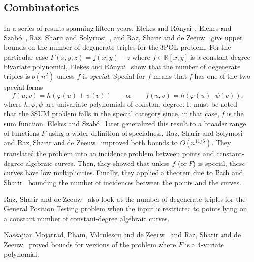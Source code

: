 \subsection{Combinatorics}%
\label{sec:problem:pol:combinatorics}

In a series of results spanning fifteen years,
Elekes and Rónyai~\cite{ER00},
Elekes and Szabó~\cite{ES12},
Raz, Sharir and Solymosi~\cite{RSS14}, and
Raz, Sharir and de Zeeuw~\cite{RSZ15}
give upper bounds on the number of degenerate triples for the 3POL problem.
%
For the particular case $F(x,y,z) = f(x,y) - z$ where $f \in \mathbb{R}[x,y]$
is a constant-degree bivariate polynomial, Elekes and Rónyai~\cite{ER00} show
that the number of degenerate triples is $o(n^2)$ unless $f$ is
\emph{special}. Special for $f$ means that $f$ has one of the two special forms
\begin{displaymath}
f(u,v)=h(\varphi(u)+\psi(v))
\qquad
\text{or}
\qquad
f(u,v)=h(\varphi(u)\cdot\psi(v)),
\end{displaymath}
where $h,\varphi,\psi$ are univariate polynomials of constant degree.
It must be noted that the 3SUM problem falls in the special category since, in
that case, \( f \) is the sum function.
%
Elekes and Szabó~\cite{ES12} later generalized this result to a broader range
of functions $F$ using a wider definition of specialness.
%
Raz, Sharir and Solymosi~\cite{RSS14} and Raz, Sharir and de Zeeuw~\cite{RSZ15}
improved both bounds to $O(n^{11/6})$.
%
They translated the problem into an incidence problem between points and
constant-degree algebraic curves. Then, they showed that unless $f$ (or $F$) is
special, these curves have low multiplicities. Finally, they applied a theorem
due to Pach and Sharir~\cite{PS98} bounding the number of incidences between
the points and the curves.
%


Raz, Sharir and de Zeeuw~\cite{RSZ15} also look at the number of degenerate
triples for the General Position Testing problem when the input is restricted
to points lying on a constant number of constant-degree algebraic curves.
%


Nassajian Mojarrad, Pham, Valculescu and de Zeeuw~\cite{MPVd16} and
Raz, Sharir and de Zeeuw~\cite{RSZ16} proved bounds for versions of the
problem where $F$ is a $4$-variate polynomial.

